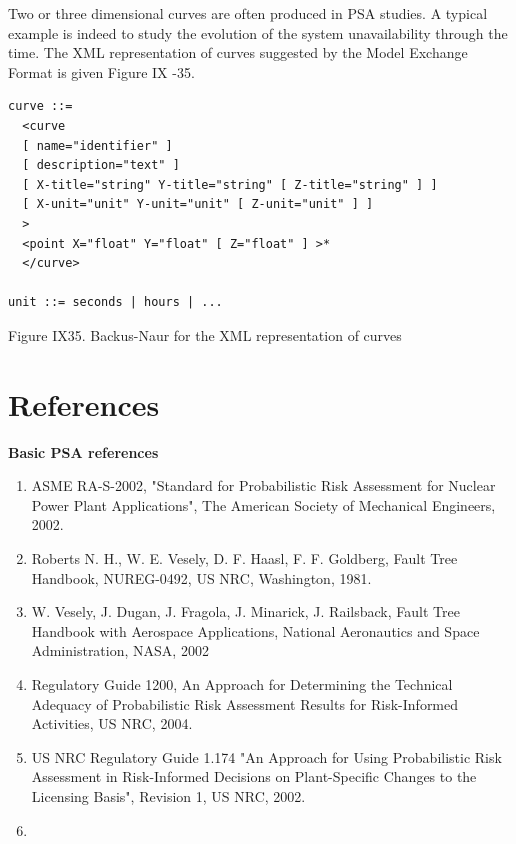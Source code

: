 \documentclass[11pt]{article}
\begin{document}
Two or three dimensional curves are often produced in PSA studies. A
typical example is indeed to study the evolution of the system
unavailability through the time. The XML representation of curves
suggested by the Model Exchange Format is given Figure IX -35.

\lstset{language=[LaTeX]TeX,label= ,caption= ,captionpos=b,numbers=none}
\begin{lstlisting}
curve ::=
  <curve
  [ name="identifier" ]
  [ description="text" ]
  [ X-title="string" Y-title="string" [ Z-title="string" ] ]
  [ X-unit="unit" Y-unit="unit" [ Z-unit="unit" ] ]
  >
  <point X="float" Y="float" [ Z="float" ] >*
  </curve>

unit ::= seconds | hours | ...
\end{lstlisting}

Figure IX35. Backus-Naur for the XML representation of curves


\clearpage

\section{References}
\label{sec:orgd1f86de}

\textbf{Basic PSA references}

\begin{enumerate}
\item ASME RA-S-2002, "Standard for Probabilistic Risk Assessment for
Nuclear Power Plant Applications", The American Society of Mechanical
Engineers, 2002.

\item Roberts N. H., W. E. Vesely, D. F. Haasl, F. F. Goldberg, Fault Tree
Handbook, NUREG-0492, US NRC, Washington, 1981.

\item W. Vesely, J. Dugan, J. Fragola, J. Minarick, J. Railsback, Fault
Tree Handbook with Aerospace Applications, National Aeronautics and
Space Administration, NASA, 2002

\item Regulatory Guide 1200, An Approach for Determining the Technical
Adequacy of Probabilistic Risk Assessment Results for Risk-Informed
Activities, US NRC, 2004.

\item US NRC Regulatory Guide 1.174 "An Approach for Using Probabilistic
Risk Assessment in Risk-Informed Decisions on Plant-Specific Changes
to the Licensing Basis", Revision 1, US NRC, 2002.

\item 
\end{enumerate}
\end{document}
